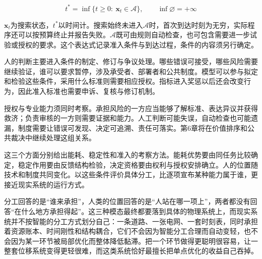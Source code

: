\begin{equation}
t^{\ast}=\inf\bigl\{t\ge0:\ \mathbf{x}_t\in\mathcal{A}\bigr\},\qquad \inf\varnothing=+\infty
\end{equation}

$\mathbf x_t$为搜索状态，$t^*$以时间计。搜索始终未进入$\mathcal A$时，首次到达时刻为无穷，实际程序还可以按预算终止并报告失败。$\mathcal A$既可由规则自动检查，也可包含需要进一步试验或授权的要求。这个表达式记录准入条件与到达过程，条件的内容须另行确定。

人的判断主要进入条件的制定、修订与争议处理。哪些错误可接受，哪些风险需要继续验证，谁可以要求暂停，涉及承受者、部署者和公共制度。模型可以参与拟定和检验这些条件，采用什么标准则需要相应授权。指标进入奖惩以后还会改变行为，因此准入标准也需要申诉、复核与修订机制。\cite{goodhart1975problems,campbell1979assessing}

授权与专业能力须同时考察。承担风险的一方应当能够了解标准、表达异议并获得救济；负责审核的一方则需要证据和能力。人工判断可能失误，自动检查也可能遗漏，制度需要让错误可发现、决定可追溯、责任可落实。第6章将在价值排序和公共裁决中继续处理这组关系。

这三个方面分别给出能耗、稳定性和准入的考察方法。能耗优势要由同任务比较确定，稳定作用要由反馈结构检验，决定资格要由权利与授权安排确立。人的位置随技术和制度共同变化。以这些条件评价具体分工，比逐项宣布某种能力属于谁，更接近现实系统的运行方式。

分工回答的是“谁来承担”，人类的位置回答的是“人站在哪一项上”，两者都没有回答“在什么地方承担得起”。这三种模态最终都要落到具体的物理系统上，而现实系统并不按智能的分工方式划分自己：一条道路、一张电网、一套时刻表，同时承担着资源账本、时间刚性和结构耦合，它们不会因为智能分工合理而自动变轻，也不会因为某一环节被局部优化而整体降低黏滞。把一个环节做得更聪明很容易，让一整套位移系统变得更轻很难，而这类系统恰好最擅长把单点优化的收益自己吞掉。
